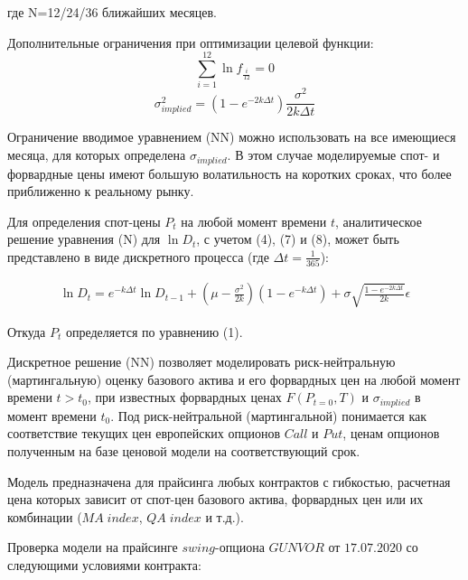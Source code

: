 \documentclass[12pt, a4paper]{article}
\begin{document}
где N=12/24/36 ближайших месяцев.

Дополнительные ограничения при оптимизации целевой функции:
\begin{equation}
    \sum_{i=1}^{12} \ln f_{\frac{i}{12}} = 0
\end{equation} 
\begin{equation}
    \sigma_{implied}^2 = (1-e^{-2k\Delta t}) \frac{\sigma^2}{2k\Delta t}
\end{equation}

Ограничение вводимое уравнением (NN) можно использовать на все имеющиеся месяца, для которых определена $\sigma_{implied}$. В этом случае моделируемые спот- и форвардные цены имеют большую волатильность на коротких сроках,  что более приближенно к реальному рынку.

Для определения спот-цены $P_t$  на любой момент времени $t$, аналитическое решение уравнения (N) для $\ln D_t$, с учетом (4), (7) и (8), может быть представлено в виде дискретного процесса (где $\Delta t=\frac{1}{365}$):

\begin{multline}
\ln D_t = e^{-k\Delta t} \ln D_{t-1} + (\mu-\frac{\sigma^2}{2k})(1-e^{-k\Delta t} )  + \sigma \sqrt{\frac{1-e^{-2k\Delta t}}{2k}} \epsilon
\end{multline}

Откуда $P_t$ определяется по уравнению (1).

Дискретное решение (NN) позволяет моделировать риск-нейтральную (мартингальную) оценку базового актива и его форвардных цен на любой момент времени $t>t_0$, при известных форвардных ценах $F(P_{t=0}, T)$  и $\sigma_{implied}$ в момент времени $t_0$. Под риск-нейтральной (мартингальной) понимается как соответствие текущих цен европейских опционов $Call$ и $Put$, ценам опционов полученным на базе ценовой модели на соответствующий срок.

Модель предназначена для прайсинга любых контрактов с гибкостью, расчетная цена которых зависит от спот-цен базового актива, форвардных цен или их комбинации ($MA\; index$, $QA\; index$ и т.д.).

Проверка модели на прайсинге $swing$-опциона $GUNVOR$ от $17.07.2020$ со следующими условиями контракта:  
\end{document}
